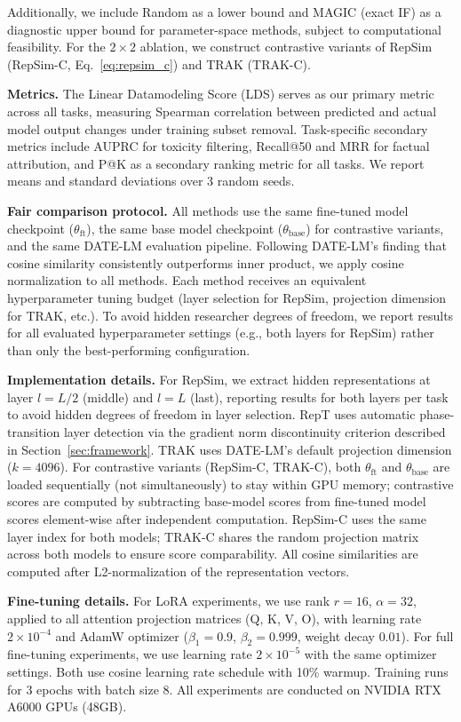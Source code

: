\documentclass{article}
\begin{document}
Additionally, we include Random as a lower bound and MAGIC (exact IF) as a diagnostic upper bound for parameter-space methods, subject to computational feasibility. For the $2 \times 2$ ablation, we construct contrastive variants of RepSim (RepSim-C, Eq.~\ref{eq:repsim_c}) and TRAK (TRAK-C).

\textbf{Metrics.} The Linear Datamodeling Score (LDS) serves as our primary metric across all tasks, measuring Spearman correlation between predicted and actual model output changes under training subset removal. Task-specific secondary metrics include AUPRC for toxicity filtering, Recall@50 and MRR for factual attribution, and P@K as a secondary ranking metric for all tasks. We report means and standard deviations over 3 random seeds.

\textbf{Fair comparison protocol.} All methods use the same fine-tuned model checkpoint ($\theta_\text{ft}$), the same base model checkpoint ($\theta_\text{base}$) for contrastive variants, and the same DATE-LM evaluation pipeline. Following DATE-LM's finding that cosine similarity consistently outperforms inner product, we apply cosine normalization to all methods. Each method receives an equivalent hyperparameter tuning budget (layer selection for RepSim, projection dimension for TRAK, etc.). To avoid hidden researcher degrees of freedom, we report results for all evaluated hyperparameter settings (e.g., both layers for RepSim) rather than only the best-performing configuration.

\textbf{Implementation details.} For RepSim, we extract hidden representations at layer $l = L/2$ (middle) and $l = L$ (last), reporting results for both layers per task to avoid hidden degrees of freedom in layer selection. RepT uses automatic phase-transition layer detection via the gradient norm discontinuity criterion described in Section~\ref{sec:framework}. TRAK uses DATE-LM's default projection dimension ($k = 4096$). For contrastive variants (RepSim-C, TRAK-C), both $\theta_\text{ft}$ and $\theta_\text{base}$ are loaded sequentially (not simultaneously) to stay within GPU memory; contrastive scores are computed by subtracting base-model scores from fine-tuned model scores element-wise after independent computation. RepSim-C uses the same layer index for both models; TRAK-C shares the random projection matrix across both models to ensure score comparability. All cosine similarities are computed after L2-normalization of the representation vectors.

\textbf{Fine-tuning details.} For LoRA experiments, we use rank $r = 16$, $\alpha = 32$, applied to all attention projection matrices (Q, K, V, O), with learning rate $2 \times 10^{-4}$ and AdamW optimizer ($\beta_1 = 0.9$, $\beta_2 = 0.999$, weight decay $0.01$). For full fine-tuning experiments, we use learning rate $2 \times 10^{-5}$ with the same optimizer settings. Both use cosine learning rate schedule with 10\% warmup. Training runs for 3 epochs with batch size 8. All experiments are conducted on NVIDIA RTX A6000 GPUs (48GB).
\end{document}
